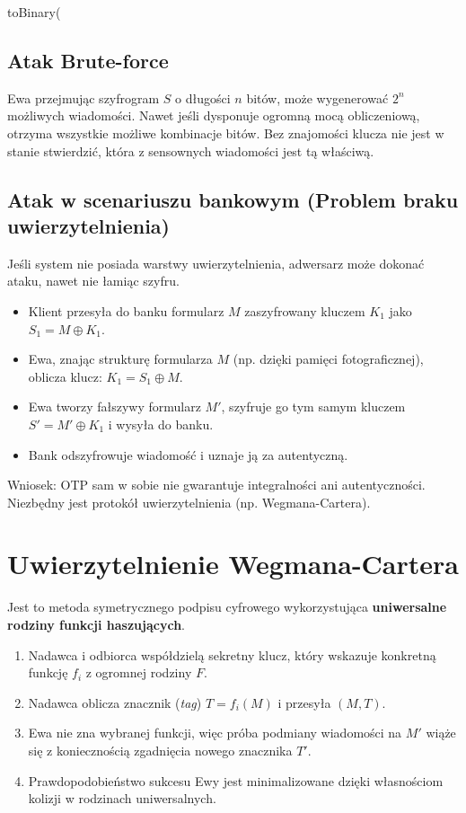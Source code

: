 toBinary(\documentclass{article}
\begin{document}
\subsection{Atak Brute-force}
Ewa przejmując szyfrogram $S$ o długości $n$ bitów, może wygenerować $2^n$ możliwych wiadomości. Nawet jeśli dysponuje ogromną mocą obliczeniową, otrzyma wszystkie możliwe kombinacje bitów. Bez znajomości klucza nie jest w stanie stwierdzić, która z sensownych wiadomości jest tą właściwą.

\subsection{Atak w scenariuszu bankowym (Problem braku uwierzytelnienia)}
Jeśli system nie posiada warstwy uwierzytelnienia, adwersarz może dokonać ataku, nawet nie łamiąc szyfru.
\begin{itemize}
    \item Klient przesyła do banku formularz $M$ zaszyfrowany kluczem $K_1$ jako $S_1 = M \oplus K_1$.
    \item Ewa, znając strukturę formularza $M$ (np. dzięki pamięci fotograficznej), oblicza klucz: $K_1 = S_1 \oplus M$.
    \item Ewa tworzy fałszywy formularz $M'$, szyfruje go tym samym kluczem $S' = M' \oplus K_1$ i wysyła do banku.
    \item Bank odszyfrowuje wiadomość i uznaje ją za autentyczną.
\end{itemize}
Wniosek: OTP sam w sobie nie gwarantuje integralności ani autentyczności. Niezbędny jest protokół uwierzytelnienia (np. Wegmana-Cartera).

\section{Uwierzytelnienie Wegmana-Cartera}

Jest to metoda symetrycznego podpisu cyfrowego wykorzystująca \textbf{uniwersalne rodziny funkcji haszujących}.
\begin{enumerate}
    \item Nadawca i odbiorca współdzielą sekretny klucz, który wskazuje konkretną funkcję $f_i$ z ogromnej rodziny $F$.
    \item Nadawca oblicza znacznik (\textit{tag}) $T = f_i(M)$ i przesyła $(M, T)$.
    \item Ewa nie zna wybranej funkcji, więc próba podmiany wiadomości na $M'$ wiąże się z koniecznością zgadnięcia nowego znacznika $T'$.
    \item Prawdopodobieństwo sukcesu Ewy jest minimalizowane dzięki własnościom kolizji w rodzinach uniwersalnych.
\end{enumerate}
\end{document}

